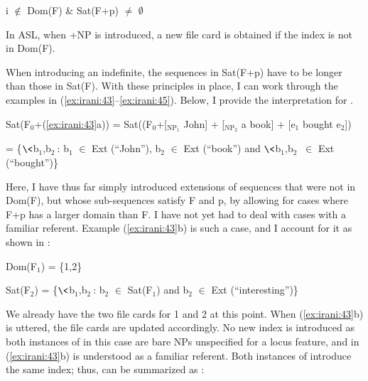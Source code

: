 \documentclass[output=paper,
modfonts
]{langscibook}
\begin{document}
\begin{exe}
\ex \label{ex:irani:47} i \(\notin\) Dom(F) \& Sat(F+p) \(\neq\) \(\emptyset\)
\end{exe}

In ASL, when +NP is introduced, a new file card is obtained if the index is not in Dom(F). 

When introducing an indefinite, the sequences in Sat(F+p) have to be longer than those in Sat(F). With these principles in place, I can work through the examples in (\ref{ex:irani:43}--\ref{ex:irani:45}). Below, I provide the interpretation for .

\begin{exe}

\ex Sat(F$_0$+(\ref{ex:irani:43}a)) = Sat((F$_0$+[$_{\text{NP}_{1}}$ John] + [$_{\text{NP}_{2}}$ a book] + [e$_1$ bought e$_2$])\par 
= \{$\<$b$_1$,b$_2\>$: b$_1$ \(\in\) Ext (``John''), b$_2$ \(\in\) Ext (``book'') and $\<$b$_1$,b$_2\>$ \(\in\) Ext (``bought'')\} \par 

\end{exe}

Here, I have thus far simply introduced extensions of sequences that were not in Dom(F), but whose sub-sequences satisfy F and p, by allowing for cases where F+p has a larger domain than F. I have not yet had to deal with cases with a familiar referent. Example (\ref{ex:irani:43}b) is such a case, and I account for it as shown in : 

\begin{exe}

\ex  \label{ex:irani:49} Dom(F$_1$) = \{1,2\} \par 
Sat(F$_2$) = \{$\<$b$_1$,b$_2\>$: b$_2$ \(\in\) Sat(F$_1$) and b$_2$ \(\in\) Ext (``interesting'')\} \par 

\end{exe}

We already have the two file cards for 1 and 2 at this point. When (\ref{ex:irani:43}b) is uttered, the file cards are updated accordingly. No new index is introduced as both instances of  in this case are bare NPs unspecified for a locus feature, and  in (\ref{ex:irani:43}b) is understood as a familiar referent. Both instances of  introduce the same index; thus,  can be summarized as : 
\end{document}
